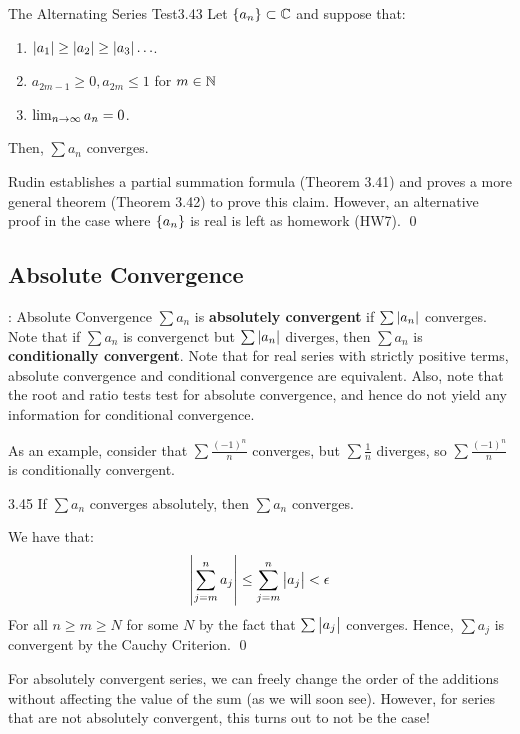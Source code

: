 \setcounter{rudin}{42}
\begin{theorem}{The Alternating Series Test}{3.43}
    Let $\set{a_n} \subset \mathbb{C}$ and suppose that:
    \begin{enumerate}
        \item $\abs{a_1} \geq \abs{a_2} \geq \abs{a_3} \ldots$.
        \item $a_{2m-1} \geq 0, a_{2m} \leq 1$ for $m \in \mathbb{N}$
        \item $\lim_{n \rightarrow \infty} a_n = 0$.
    \end{enumerate}
    Then, $\sum a_n$ converges.
\end{theorem}
\begin{nproof}
    Rudin establishes a partial summation formula (Theorem 3.41) and proves a more general theorem (Theorem 3.42) to prove this claim. However, an alternative proof in the case where $\set{a_n}$ is real is left as homework (HW7). \qed
\end{nproof}

\subsection{Absolute Convergence}
\begin{ndef}{: Absolute Convergence}{}
    $\sum a_n$ is \textbf{absolutely convergent} if $\sum \abs{a_n}$ converges. Note that if $\sum a_n$ is convergenct but $\sum \abs{a_n}$ diverges, then $\sum a_n$ is \textbf{conditionally convergent}. Note that for real series with strictly positive terms, absolute convergence and conditional convergence are equivalent. Also, note that the root and ratio tests test for absolute convergence, and hence do not yield any information for conditional convergence. 
\end{ndef}
\noindent As an example, consider that $\sum \frac{(-1)^n}{n}$ converges, but $\sum \frac{1}{n}$ diverges, so $\sum \frac{(-1)^n}{n}$ is conditionally convergent.

\setcounter{rudin}{44}
\begin{theorem}{}{3.45}
    If $\sum a_n$ converges absolutely, then $\sum a_n$ converges.
\end{theorem}
\begin{nproof}
    We have that:
    \begin{align*}
        \abs{\sum_{j=m}^n a_j} \leq \sum_{j=m}^n\abs{a_j} < \epsilon
    \end{align*}
    For all $n \geq m \geq N$ for some $N$ by the fact that $\sum \abs{a_j}$ converges. Hence, $\sum a_j$ is convergent by the Cauchy Criterion. \qed
\end{nproof}
\noindent For absolutely convergent series, we can freely change the order of the additions without affecting the value of the sum (as we will soon see). However, for series that are not absolutely convergent, this turns out to not be the case!

